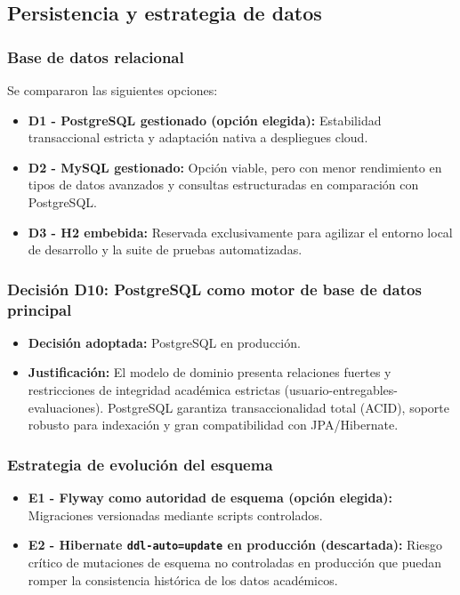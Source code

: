 \FloatBarrier
\subsection{Persistencia y estrategia de datos}

\subsubsection*{Base de datos relacional}
Se compararon las siguientes opciones:
\begin{itemize}
    \item \textbf{D1 - PostgreSQL gestionado (opci\'on elegida):} Estabilidad transaccional estricta y adaptaci\'on nativa a despliegues cloud.
    \item \textbf{D2 - MySQL gestionado:} Opci\'on viable, pero con menor rendimiento en tipos de datos avanzados y consultas estructuradas en comparación con PostgreSQL.
    \item \textbf{D3 - H2 embebida:} Reservada exclusivamente para agilizar el entorno local de desarrollo y la suite de pruebas automatizadas.
\end{itemize}

\subsubsection*{Decisi\'on D10: PostgreSQL como motor de base de datos principal}
\begin{itemize}
    \item \textbf{Decisi\'on adoptada:} PostgreSQL \cite{postgresql} en producci\'on.
    \item \textbf{Justificaci\'on:} El modelo de dominio presenta relaciones fuertes y restricciones de integridad acad\'emica estrictas (usuario-entregables-evaluaciones). PostgreSQL garantiza transaccionalidad total (ACID), soporte robusto para indexaci\'on y gran compatibilidad con JPA/Hibernate.
\end{itemize}

\subsubsection*{Estrategia de evoluci\'on del esquema}
\begin{itemize}
    \item \textbf{E1 - Flyway como autoridad de esquema (opci\'on elegida):} Migraciones versionadas mediante scripts controlados.
    \item \textbf{E2 - Hibernate \texttt{ddl-auto=update} en producci\'on (descartada):} Riesgo cr\'itico de mutaciones de esquema no controladas en producci\'on que puedan romper la consistencia hist\'orica de los datos acad\'emicos.
\end{itemize}

